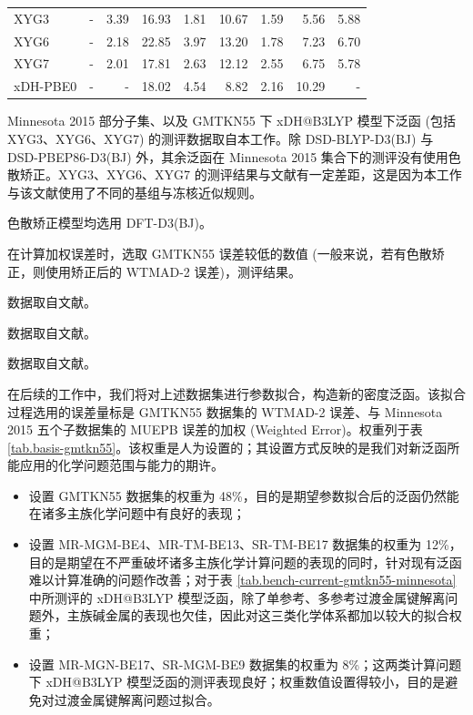 \begin{table}
\begin{tabular}{l:d{2.4}d{2.4}:d{2.2}d{2.2}d{2.2}d{2.2}d{2.2}:d{2.2}}
  XYG3            
  & -               & 3.39 & 16.93      & 1.81        & 10.67      & 1.59       & 5.56       & 5.88     \\
  XYG6            
  & -               & 2.18 & 22.85      & 3.97        & 13.20      & 1.78       & 7.23       & 6.70     \\
  XYG7            
  & -               & 2.01 & 17.81      & 2.63        & 12.12      & 2.55       & 6.75       & 5.78     \\
  xDH-PBE0        
  & -               & -               & 18.02      & 4.54        & 8.82       & 2.16       & 10.29      & -        \\ \hline
  \end{tabular}

  \raggedright
  \par{} Minnesota 2015 部分子集、以及 GMTKN55 下 xDH@B3LYP 模型下泛函 (包括 XYG3、XYG6、XYG7) 的测评数据取自本工作。除 DSD-BLYP-D3(BJ) 与 DSD-PBEP86-D3(BJ) 外，其余泛函在 Minnesota 2015 集合下的测评没有使用色散矫正。XYG3、XYG6、XYG7 的测评结果与文献\cite{Zhang-Xu.JPCL.2021}有一定差距，这是因为本工作与该文献使用了不同的基组与冻核近似规则。
  \par{} 色散矫正模型均选用 DFT-D3(BJ)。
  \par{} 在计算加权误差时，选取 GMTKN55 误差较低的数值 (一般来说，若有色散矫正，则使用矫正后的 WTMAD-2 误差)，测评结果。
  \par{} 数据取自文献\cite{Goerigk-Grimme.PCCP.2017}。
  \par{} 数据取自文献\cite{Mehta-Goerigk.PCCP.2018}。
  \par{} 数据取自文献\cite{Santra-Martin.JPCA.2019}。
\end{table}

在后续的工作中，我们将对上述数据集进行参数拟合，构造新的密度泛函。该拟合过程选用的误差量标是 GMTKN55 数据集的 WTMAD-2 误差、与 Minnesota 2015 五个子数据集的 MUEPB 误差的加权 (Weighted Error)。权重列于表 \ref{tab.basis-gmtkn55}。该权重是人为设置的；其设置方式反映的是我们对新泛函所能应用的化学问题范围与能力的期许。
\begin{itemize}[nosep]
  \item 设置 GMTKN55 数据集的权重为 48\%，目的是期望参数拟合后的泛函仍然能在诸多主族化学问题中有良好的表现；
  \item 设置 MR-MGM-BE4、MR-TM-BE13、SR-TM-BE17 数据集的权重为 12\%，目的是期望在不严重破坏诸多主族化学计算问题的表现的同时，针对现有泛函难以计算准确的问题作改善；对于表 \ref{tab.bench-current-gmtkn55-minnesota} 中所测评的 xDH@B3LYP 模型泛函，除了单参考、多参考过渡金属键解离问题外，主族碱金属的表现也欠佳，因此对这三类化学体系都加以较大的拟合权重；
  \item 设置 MR-MGN-BE17、SR-MGM-BE9 数据集的权重为 8\%；这两类计算问题下 xDH@B3LYP 模型泛函的测评表现良好；权重数值设置得较小，目的是避免对过渡金属键解离问题过拟合。
\end{itemize}

